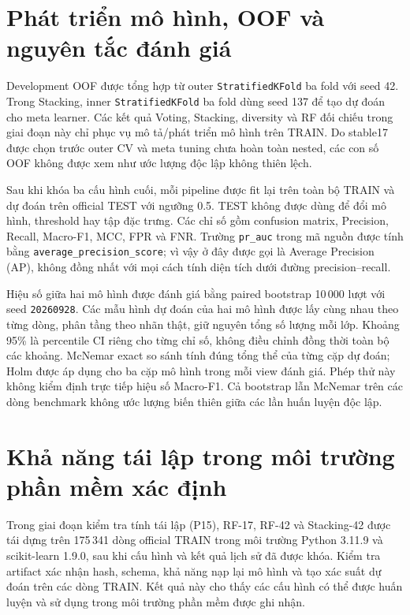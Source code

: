 \section{Phát triển mô hình, OOF và nguyên tắc đánh giá}
\label{sec:method-validation}

Development OOF được tổng hợp từ outer \texttt{StratifiedKFold} ba fold với seed 42. Trong Stacking, inner \texttt{StratifiedKFold} ba fold dùng seed 137 để tạo dự đoán cho meta learner. Các kết quả Voting, Stacking, diversity và RF đối chiếu trong giai đoạn này chỉ phục vụ mô tả/phát triển mô hình trên TRAIN. Do stable17 được chọn trước outer CV và meta tuning chưa hoàn toàn nested, các con số OOF không được xem như ước lượng độc lập không thiên lệch.

Sau khi khóa ba cấu hình cuối, mỗi pipeline được fit lại trên toàn bộ TRAIN và dự đoán trên official TEST với ngưỡng 0.5. TEST không được dùng để đổi mô hình, threshold hay tập đặc trưng. Các chỉ số gồm confusion matrix, Precision, Recall, Macro-F1, MCC, FPR và FNR. Trường \texttt{pr\_auc} trong mã nguồn được tính bằng \texttt{average\_precision\_score}; vì vậy ở đây được gọi là Average Precision (AP), không đồng nhất với mọi cách tính diện tích dưới đường precision--recall.

Hiệu số giữa hai mô hình được đánh giá bằng paired bootstrap 10\,000 lượt với seed \texttt{20260928}. Các mẫu hình dự đoán của hai mô hình được lấy cùng nhau theo từng dòng, phân tầng theo nhãn thật, giữ nguyên tổng số lượng mỗi lớp. Khoảng 95\% là percentile CI riêng cho từng chỉ số, không điều chỉnh đồng thời toàn bộ các khoảng. McNemar exact so sánh tính đúng tổng thể của từng cặp dự đoán; Holm được áp dụng cho ba cặp mô hình trong mỗi view đánh giá. Phép thử này không kiểm định trực tiếp hiệu số Macro-F1. Cả bootstrap lẫn McNemar trên các dòng benchmark không ước lượng biến thiên giữa các lần huấn luyện độc lập.

\section{Khả năng tái lập trong môi trường phần mềm xác định}
\label{sec:method-p15}

Trong giai đoạn kiểm tra tính tái lập (P15), RF-17, RF-42 và Stacking-42 được tái dựng trên 175\,341 dòng official TRAIN trong môi trường Python 3.11.9 và scikit-learn 1.9.0, sau khi cấu hình và kết quả lịch sử đã được khóa. Kiểm tra artifact xác nhận hash, schema, khả năng nạp lại mô hình và tạo xác suất dự đoán trên các dòng TRAIN. Kết quả này cho thấy các cấu hình có thể được huấn luyện và sử dụng trong môi trường phần mềm được ghi nhận.

